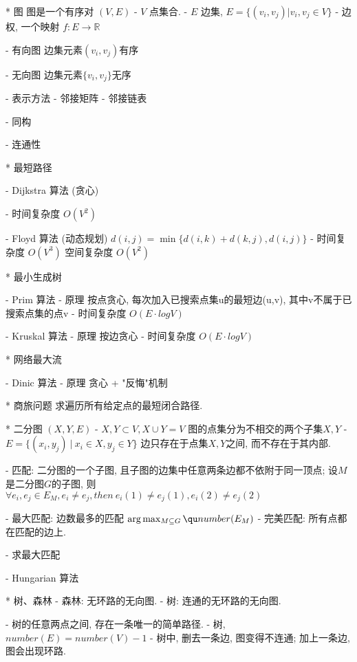* 图
	\Define
		图是一个有序对 $(V, E)$
			- $V$ 点集合.
			- $E$ 边集, $E = \{(v_i, v_j) | v_i, v_j \in V\}$
			- 边权, 一个映射 $f: E \to \mathbb R$ 

		- 有向图
			边集元素$(v_i, v_j)$有序
			
		- 无向图
			边集元素$\{v_i, v_j\}$无序

	\Property
		- 表示方法
			- 邻接矩阵
			- 邻接链表

		- 同构

		- 连通性

		* 最短路径
			\Problem

			\Algorithm
				- Dijkstra 算法 (贪心)
					
					- 时间复杂度 $O(V^2)$

				- Floyd 算法 (动态规划)
					$d(i,j) = \min\{ d(i,k) + d(k,j) , d(i,j) \}  \tag{状态转移方程}$
					- 时间复杂度 $O(V^3)$
						空间复杂度 $O(V^2)$

		* 最小生成树
			\Problem

			\Algorithm
				- Prim 算法
					- 原理	
						按点贪心, 每次加入已搜索点集u的最短边(u,v), 其中v不属于已搜索点集的点v
					- 时间复杂度 $O(E·logV)$

				- Kruskal 算法
					- 原理
						按边贪心
					- 时间复杂度 $O(E·logV)$

		* 网络最大流
			\Problem

			\Algorithm
				- Dinic 算法
					- 原理
						贪心 + "反悔"机制

		* 商旅问题
			\Problem
				求遍历所有给定点的最短闭合路径.

	\Include
		* 二分图
			\Define
				$(X, Y, E)$
				- $X, Y \subset V, X \cup Y = V$
					图的点集分为不相交的两个子集$X, Y$
				- $E = \{(x_i, y_j) \ |\ x_i \in X, y_j \in Y\}$
					边只存在于点集$X, Y$之间, 而不存在于其内部.

			\Property
				- 匹配: 二分图的一个子图, 且子图的边集中任意两条边都不依附于同一顶点;
					设$M$是二分图$G$的子图, 则
					$\forall e_i, e_j \in E_M, e_i≠e_j, then\ e_i(1) ≠e_j(1), e_i(2) ≠e_j(2)$

					- 最大匹配: 边数最多的匹配 $\arg\max_{M \subseteq G} \qu number(E_M)$
					- 完美匹配: 所有点都在匹配的边上.

					- 求最大匹配
						\Problem
							
						\Algorithm
							- Hungarian 算法

		* 树、森林
			\Define
				- 森林: 无环路的无向图.
				- 树: 连通的无环路的无向图.

			\Property
				- 树的任意两点之间, 存在一条唯一的简单路径.
				- 树, $number(E) = number(V) - 1$
				- 树中, 删去一条边, 图变得不连通; 加上一条边, 图会出现环路.

